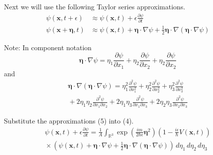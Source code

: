 \documentclass[12pt]{article}
\begin{document}
Next we will use the following Taylor series approximations.
\begin{equation*}
\begin{aligned}
\psi(\mathbf x,t+\epsilon)&\approx\psi(\mathbf x,t)+\epsilon\frac{\partial\psi}{\partial t}
\\
\psi(\mathbf x+\boldsymbol\eta,t)&\approx\psi(\mathbf x,t)+\boldsymbol\eta\cdot\nabla\psi
+\tfrac{1}{2}\boldsymbol\eta\cdot\nabla(\boldsymbol\eta\cdot\nabla\psi)
\end{aligned}
\tag{5}
\end{equation*}

Note: In component notation
\begin{equation*}
\boldsymbol\eta\cdot\nabla\psi=
\eta_1\frac{\partial\psi}{\partial x_1}+
\eta_2\frac{\partial\psi}{\partial x_2}+
\eta_2\frac{\partial\psi}{\partial x_2}
\end{equation*}
and
\begin{multline*}
\boldsymbol\eta\cdot\nabla(\boldsymbol\eta\cdot\nabla\psi)=
\eta_1^2\frac{\partial^2\psi}{\partial x_1^2}
+\eta_2^2\frac{\partial^2\psi}{\partial x_2^2}
+\eta_3^2\frac{\partial^2\psi}{\partial x_3^2}
\\
{}+2\eta_1\eta_2\frac{\partial^2\psi}{\partial x_1\partial x_2}
+2\eta_1\eta_3\frac{\partial^2\psi}{\partial x_1\partial x_3}
+2\eta_2\eta_3\frac{\partial^2\psi}{\partial x_2\partial x_3}
\end{multline*}

Substitute the approximations (5) into (4).
\begin{multline*}
\psi(\mathbf{x},t)+\epsilon\frac{\partial\psi}{\partial t}=
\frac{1}{A}\int_{\mathbb R^3}
\exp\left(\frac{im}{2\hbar\epsilon}\boldsymbol\eta^2\right)
\left(1-\frac{i\epsilon}{\hbar}V\left(\mathbf x,t\right)\right)
\\
{}\times\left(
\psi(\mathbf x,t)+\boldsymbol\eta\cdot\nabla\psi
+\tfrac{1}{2}\boldsymbol\eta\cdot\nabla(\boldsymbol\eta\cdot\nabla\psi)
\right)\,d\eta_1\,d\eta_2\,d\eta_3
\tag{6}
\end{multline*}
\end{document}
